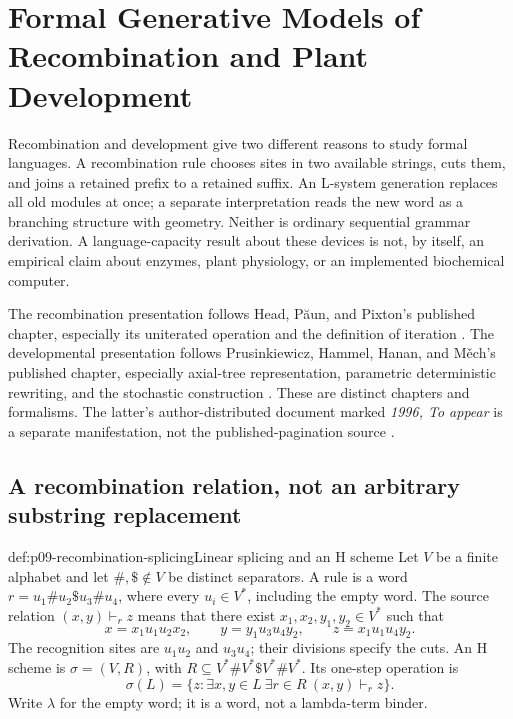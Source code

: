 \section{Formal Generative Models of Recombination and Plant Development}
\label{sec:p09-recombination-development}

Recombination and development give two different reasons to study formal
languages. A recombination rule chooses sites in two available strings, cuts
them, and joins a retained prefix to a retained suffix. An L-system generation
replaces all old modules at once; a separate interpretation reads the new
word as a branching structure with geometry. Neither is ordinary sequential
grammar derivation. A language-capacity result about these devices is not,
by itself, an empirical claim about enzymes, plant physiology, or an
implemented biochemical computer.

The recombination presentation follows Head, P\u{a}un, and Pixton's published
chapter, especially its uniterated operation and the definition of iteration
\cite[pp.~295--307]{HeadPaunPixton1997RecombinationIntake}.
The developmental presentation follows Prusinkiewicz, Hammel, Hanan, and
M\v{e}ch's published chapter, especially axial-tree representation,
parametric deterministic rewriting, and the stochastic construction
\cite[pp.~535--558]{PrusinkiewiczEtAl1997DevelopmentIntake}.
These are distinct chapters and formalisms. The latter's author-distributed
document marked \emph{1996, To appear} is a separate manifestation, not the
published-pagination source \cite{PrusinkiewiczEtAl1996DevelopmentPreprintIntake}.

\subsection{A recombination relation, not an arbitrary substring replacement}
\label{sec:p09-recombination-splicing}

\begin{hbdefinition}{def:p09-recombination-splicing}{Linear splicing and an H scheme}
Let \(V\) be a finite alphabet and let \(\#,\$\notin V\) be distinct
separators. A rule is a word \(r=u_1\#u_2\$u_3\#u_4\), where every
\(u_i\in V^*\), including the empty word. The source relation
\((x,y)\vdash_r z\) means that there exist \(x_1,x_2,y_1,y_2\in V^*\)
such that
\[
 x=x_1u_1u_2x_2,\qquad y=y_1u_3u_4y_2,\qquad z=x_1u_1u_4y_2.
\]
The recognition sites are \(u_1u_2\) and \(u_3u_4\); their divisions specify
the cuts. An H scheme is \(\sigma=(V,R)\), with
\(R\subseteq V^*\#V^*\$V^*\#V^*\). Its one-step operation is
\[
 \sigma(L)=\{z:\exists x,y\in L\ \exists r\in R\ (x,y)\vdash_r z\}.
\]
Write \(\lambda\) for the empty word; it is a word, not a lambda-term binder.
\end{hbdefinition}

